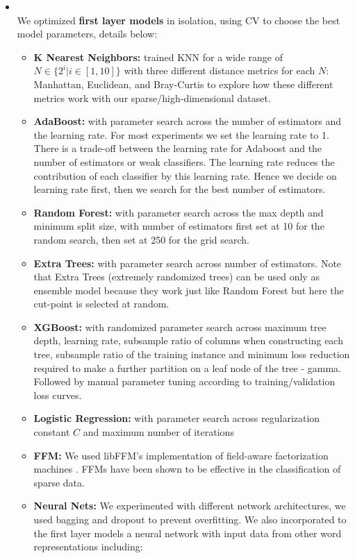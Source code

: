 \begin{itemize}
    \item {} \\
        We optimized \textbf{first layer models} in isolation, using CV to choose the best model parameters, details below:
        \begin{itemize}
            \item \textbf{K Nearest Neighbors:} trained KNN for a wide range of $N \in \{2^i | i \in [1,10]\}$ with three different distance metrics for each $N$: Manhattan, Euclidean, and Bray-Curtis to explore how these different metrics work with our sparse/high-dimensional dataset.
            \item \textbf{AdaBoost:} with parameter search across the number of estimators and the learning rate. For most experiments we set the learning rate to 1. There is a trade-off between the learning rate for Adaboost and the number of estimators or weak classifiers. The learning rate reduces the contribution of each classifier by this learning rate. Hence we decide on learning rate first, then we search for the best number of estimators.
            \item \textbf{Random Forest:} with parameter search across the max depth and minimum split size, with number of estimators first set at 10 for the random search, then set at 250 for the grid search.
            \item \textbf{Extra Trees:} with parameter search across number of estimators. Note that Extra Trees (extremely randomized trees) can be used only as ensemble model because they work just like Random Forest but here the cut-point is selected at random.
            \item \textbf{XGBoost:} with randomized parameter search across maximum tree depth, learning rate, subsample ratio of columns when constructing each tree, subsample ratio of the training instance and minimum loss reduction required to make a further partition on a leaf node of the tree - gamma. Followed by manual parameter tuning according to training/validation loss curves.
            \item \textbf{Logistic Regression:} with parameter search across regularization constant $C$ and maximum number of iterations
            \item \textbf{FFM:} We used libFFM's implementation of field-aware factorization machines \cite{juan2016field}. FFMs have been shown to be effective in the classification of sparse data.
            \item \textbf{Neural Nets:} We experimented with different network architectures, we used bagging and dropout to prevent overfitting. We also incorporated to the first layer models a neural network with input data from other word representations including:

\end{itemize}
\end{itemize}
